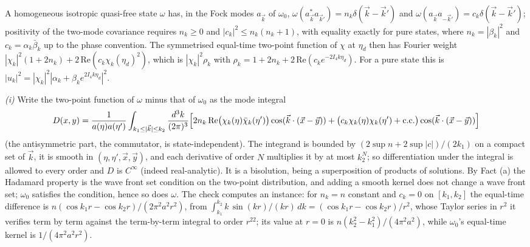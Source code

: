 A homogeneous isotropic quasi-free state $\omega$ has, in the Fock modes $a_{\vec k}$ of $\omega_{0}$, $\omega(a_{\vec k}^{*}a_{\vec k'}) = n_{k}\delta(\vec k - \vec k')$ and $\omega(a_{\vec k}a_{-\vec k'}) = c_{k}\delta(\vec k - \vec k')$; positivity of the two-mode covariance requires $n_{k} \ge 0$ and $|c_{k}|^{2} \le n_{k}(n_{k} + 1)$, with equality exactly for pure states, where $n_{k} = |\beta_{k}|^{2}$ and $c_{k} = \alpha_{k}\bar\beta_{k}$ up to the phase convention. The symmetrised equal-time two-point function of $\chi$ at $\eta_{d}$ then has Fourier weight $|\chi_{k}|^{2}(1 + 2n_{k}) + 2\,\mathrm{Re}(c_{k}\chi_{k}(\eta_{d})^{2})$, which is $|\chi_{k}|^{2}\rho_{k}$ with $\rho_{k} = 1 + 2n_{k} + 2\,\mathrm{Re}(c_{k}e^{-2I_{4}k\eta_{d}})$. For a pure state this is $|u_{k}|^{2} = |\chi_{k}|^{2}|\alpha_{k} + \beta_{k}e^{2I_{4}k\eta_{d}}|^{2}$.

\emph{(i)} Write the two-point function of $\omega$ minus that of $\omega_{0}$ as the mode integral
\[
D(x, y) = \frac{1}{a(\eta)a(\eta')}\int_{k_{1} \le |\vec k| \le k_{2}}\frac{d^{3}k}{(2\pi)^{3}}\Bigl[2n_{k}\,\mathrm{Re}\bigl(\chi_{k}(\eta)\bar\chi_{k}(\eta')\bigr)\cos(\vec k\cdot(\vec x - \vec y)) + \bigl(c_{k}\chi_{k}(\eta)\chi_{k}(\eta') + \text{c.c.}\bigr)\cos(\vec k\cdot(\vec x - \vec y))\Bigr]
\]
(the antisymmetric part, the commutator, is state-independent). The integrand is bounded by $(2\sup n + 2\sup|c|)/(2k_{1})$ on a compact set of $\vec k$, it is smooth in $(\eta, \eta', \vec x, \vec y)$, and each derivative of order $N$ multiplies it by at most $k_{2}^{N}$; so differentiation under the integral is allowed to every order and $D$ is $C^{\infty}$ (indeed real-analytic). It is a bisolution, being a superposition of products of solutions. By Fact (a) the Hadamard property is the wave front set condition on the two-point distribution, and adding a smooth kernel does not change a wave front set; $\omega_{0}$ satisfies the condition, hence so does $\omega$. The check computes an instance: for $n_{k} = n$ constant and $c_{k} = 0$ on $[k_{1}, k_{2}]$ the equal-time difference is $n(\cos k_{1}r - \cos k_{2}r)/(2\pi^{2}a^{2}r^{2})$, from $\int_{k_{1}}^{k_{2}}k\,\sin(kr)/(kr)\,dk = (\cos k_{1}r - \cos k_{2}r)/r^{2}$, whose Taylor series in $r^{2}$ it verifies term by term against the term-by-term integral to order $r^{22}$; its value at $r = 0$ is $n(k_{2}^{2} - k_{1}^{2})/(4\pi^{2}a^{2})$, while $\omega_{0}$'s equal-time kernel is $1/(4\pi^{2}a^{2}r^{2})$.

